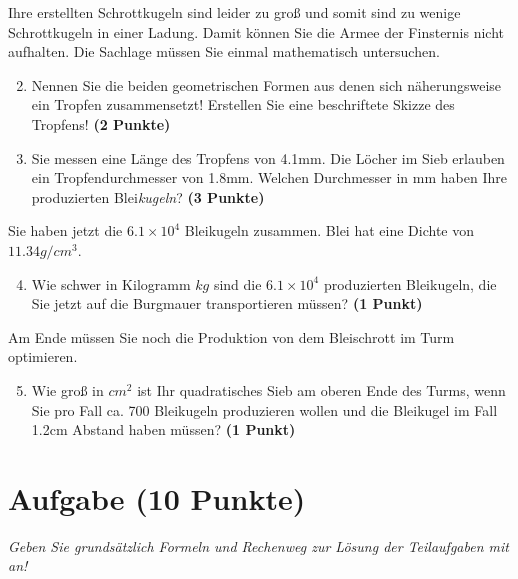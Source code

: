 \documentclass[a4paper, 9pt]{scrartcl}\usepackage[]{graphicx}\usepackage[]{xcolor}
\begin{document}
Ihre erstellten Schrottkugeln sind leider zu gro{\ss} und somit sind zu wenige
Schrottkugeln in einer Ladung. Damit k{\"o}nnen Sie die Armee der Finsternis
nicht aufhalten. Die Sachlage m{\"u}ssen Sie einmal mathematisch untersuchen.

\begin{enumerate}
  \setcounter{enumi}{1}
\item Nennen Sie die beiden geometrischen Formen aus denen sich
  n{\"a}herungsweise ein Tropfen zusammensetzt! Erstellen Sie eine beschriftete 
  Skizze des Tropfens!
  \textbf{(2 Punkte)}
\item Sie messen eine L{\"a}nge des Tropfens von 4.1mm. Die L{\"o}cher
  im Sieb erlauben ein Tropfendurchmesser von 1.8mm. Welchen
  Durchmesser in mm haben Ihre produzierten Blei\textit{kugeln}?  \textbf{(3 Punkte)}
\end{enumerate}

Sie haben jetzt die \ensuremath{6.1\times 10^{4}} Bleikugeln zusammen. Blei hat eine Dichte
von $11.34g/cm^3$.

\begin{enumerate}
  \setcounter{enumi}{3}
\item Wie schwer in Kilogramm $kg$ sind die \ensuremath{6.1\times 10^{4}} produzierten
  Bleikugeln, die Sie jetzt auf die Burgmauer transportieren m{\"u}ssen?
  \textbf{(1 Punkt)}
\end{enumerate}

Am Ende m{\"u}ssen Sie noch die Produktion von dem Bleischrott im Turm optimieren.

\begin{enumerate}
  \setcounter{enumi}{4}
\item Wie gro{\ss} in $cm^2$ ist Ihr quadratisches Sieb am oberen Ende des Turms,
  wenn Sie pro Fall ca. 700 Bleikugeln produzieren wollen und
  die Bleikugel im Fall 1.2cm Abstand haben m{\"u}ssen?  \textbf{(1
    Punkt)}
\end{enumerate}
 
\clearpage

\section{Aufgabe \hfill (10 Punkte)}

\textit{Geben Sie grunds{\"a}tzlich Formeln und Rechenweg zur L{\"o}sung der
  Teilaufgaben mit an!} \\[1Ex]
\end{document}
